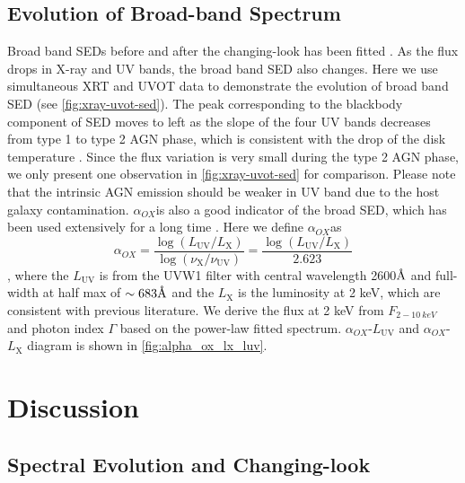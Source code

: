 \documentclass[twocolumn]{aastex63}
\newcommand{\alphaox}{$\alpha_{OX}$}
\newcommand{\angstrom}{\text{\normalfont\AA}}
\begin{document}
\subsection{Evolution of Broad-band Spectrum}\label{subsec:xray-uvot-sed}
Broad band SEDs before and after the changing-look has been fitted \citep{2016A&A...593L...9H}. As the flux drops in X-ray and UV bands, the broad band SED also changes. 
Here we use simultaneous XRT and UVOT data to demonstrate the evolution of broad band SED (see \autoref{fig:xray-uvot-sed}). The peak corresponding to the {\scriptsize blackbody} component of SED moves to left as the slope of the four UV bands decreases from type 1 to type 2 AGN phase, which is consistent with the drop of the disk temperature \citep{2016A&A...593L...9H}.  Since the flux variation is very small during the type 2 AGN phase, we only present one observation in \autoref{fig:xray-uvot-sed} for comparison. Please note that the intrinsic AGN emission should be weaker in UV band due to the host galaxy contamination. \alphaox is also a good indicator of the broad SED, which has been used extensively for a long time \citep{1979ApJ...234L...9T}. Here we define \alphaox as 
\begin{equation}
\alpha_{OX} = \frac{\log (L_\mathrm{UV} / L_\mathrm{X} )} {\log (\nu_\mathrm{X} /  \nu_\mathrm{UV} )}=\frac{\log (L_\mathrm{UV} / L_\mathrm{X} )}{2.623}
\label{definition_alpha_ox}
\end{equation}
, where the $L_\mathrm{UV}$ is from the UVW1 filter with central wavelength {2600{$\angstrom$}} and full-width at half max of $\sim 683\angstrom$ \citep{2008MNRAS.383..627P} and the $L_\mathrm{X}$ is the luminosity at 2 keV, which are consistent with previous literature. We derive the flux at 2 keV from $F_{2-10~ keV}$ and  photon index $\Gamma$ based on the power-law fitted spectrum. \alphaox-$L_\mathrm{UV}$ and \alphaox-$L_\mathrm{X}$ diagram is shown in \autoref{fig:alpha_ox_lx_luv}.




\section{Discussion}\label{sec:discussion}
\subsection{Spectral Evolution and Changing-look}
\label{sec:spectral evolution}
\end{document}
